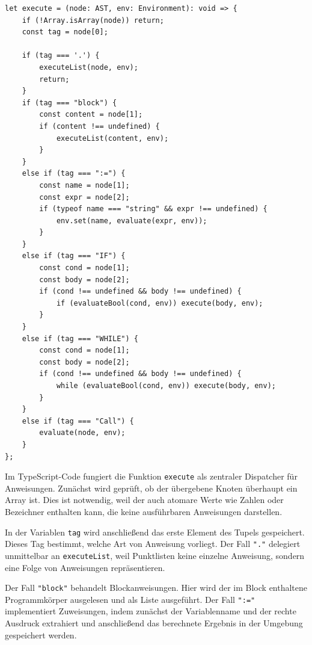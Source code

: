 \begin{listing}[htbp]
\caption{Ausführung von Anweisungen in TypeScript}
\label{lst:ts-execute}
\begin{verbatim}
let execute = (node: AST, env: Environment): void => {
    if (!Array.isArray(node)) return;
    const tag = node[0];

    if (tag === '.') {
        executeList(node, env);
        return;
    }
    if (tag === "block") {
        const content = node[1];
        if (content !== undefined) {
            executeList(content, env);
        }
    }
    else if (tag === ":=") {
        const name = node[1];
        const expr = node[2];
        if (typeof name === "string" && expr !== undefined) {
            env.set(name, evaluate(expr, env));
        }
    }
    else if (tag === "IF") {
        const cond = node[1];
        const body = node[2];
        if (cond !== undefined && body !== undefined) {
            if (evaluateBool(cond, env)) execute(body, env);
        }
    }
    else if (tag === "WHILE") {
        const cond = node[1];
        const body = node[2];
        if (cond !== undefined && body !== undefined) {
            while (evaluateBool(cond, env)) execute(body, env);
        }
    }
    else if (tag === "Call") {
        evaluate(node, env);
    }
};
\end{verbatim}
\end{listing}

Im TypeScript-Code fungiert die Funktion \texttt{execute} als zentraler Dispatcher für Anweisungen. Zunächst wird geprüft, ob der übergebene Knoten überhaupt ein Array ist. Dies ist notwendig, weil der  auch atomare Werte wie Zahlen oder Bezeichner enthalten kann, die keine ausführbaren Anweisungen darstellen.

In der Variablen \texttt{tag} wird anschließend das erste Element des Tupels gespeichert. Dieses Tag bestimmt, welche Art von Anweisung vorliegt. Der Fall \texttt{"."} delegiert unmittelbar an \texttt{executeList}, weil Punktlisten keine einzelne Anweisung, sondern eine Folge von Anweisungen repräsentieren.

Der Fall \texttt{"block"} behandelt Blockanweisungen. Hier wird der im Block enthaltene Programmkörper ausgelesen und als Liste ausgeführt. Der Fall \texttt{":="} implementiert Zuweisungen, indem zunächst der Variablenname und der rechte Ausdruck extrahiert und anschließend das berechnete Ergebnis in der Umgebung gespeichert werden.

